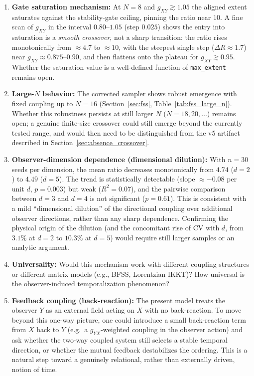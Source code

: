 \documentclass[12pt,a4paper]{article}
\begin{document}
\begin{enumerate}[leftmargin=*]
\item \textbf{Gate saturation mechanism:}
At $N=8$ and $g_{XY} \gtrsim 1.05$ the aligned extent saturates against the
stability-gate ceiling, pinning the ratio near $10$. A fine scan of $g_{XY}$
in the interval $0.80$--$1.05$ (step $0.025$) shows the entry into saturation
is a \emph{smooth crossover}, not a sharp transition: the ratio rises
monotonically from $\approx 4.7$ to $\approx 10$, with the steepest single
step ($\Delta R \approx 1.7$) near $g_{XY}\approx 0.875$--$0.90$, and then
flattens onto the plateau for $g_{XY}\gtrsim 0.95$. Whether the saturation
value is a well-defined function of \texttt{max\_extent} remains open.

\item \textbf{Large-$N$ behavior:}
The corrected sampler shows robust emergence with fixed coupling up to
$N=16$ (Section~\ref{sec:fss}, Table~\ref{tab:fss_large_n}). Whether this
robustness persists at still larger $N$ ($N=18, 20, \ldots$) remains open;
a genuine finite-size crossover could still emerge beyond the currently
tested range, and would then need to be distinguished from the v5
artifact described in Section~\ref{sec:absence_crossover}.

\item \textbf{Observer-dimension dependence (dimensional dilution):}
With $n=30$ seeds per dimension, the mean ratio decreases monotonically from
$4.74$ ($d=2$) to $4.49$ ($d=5$). The trend is statistically detectable
(slope $\approx -0.08$ per unit $d$, $p=0.003$) but weak ($R^2=0.07$), and
the pairwise comparison between $d=3$ and $d=4$ is not significant
($p=0.61$). This is consistent with a mild ``dimensional dilution'' of the
directional coupling over additional observer directions, rather than any
sharp dependence. Confirming the physical origin of the dilution (and the
concomitant rise of CV with $d$, from $3.1\%$ at $d=2$ to $10.3\%$ at $d=5$)
would require still larger samples or an analytic argument.

\item \textbf{Universality:}
Would this mechanism work with different coupling structures or different
matrix models (e.g., BFSS, Lorentzian IKKT)? How universal is the
observer-induced temporalization phenomenon?

\item \textbf{Feedback coupling (back-reaction):}
The present model treats the observer $Y$ as an external field acting on $X$
with no back-reaction. To move beyond this one-way picture, one could
introduce a small back-reaction term from $X$ back to $Y$ (e.g.\ a
$g_{YX}$-weighted coupling in the observer action) and ask whether the
two-way coupled system still selects a stable temporal direction, or whether
the mutual feedback destabilizes the ordering. This is a natural step toward
a genuinely relational, rather than externally driven, notion of time.
\end{enumerate}
\end{document}
